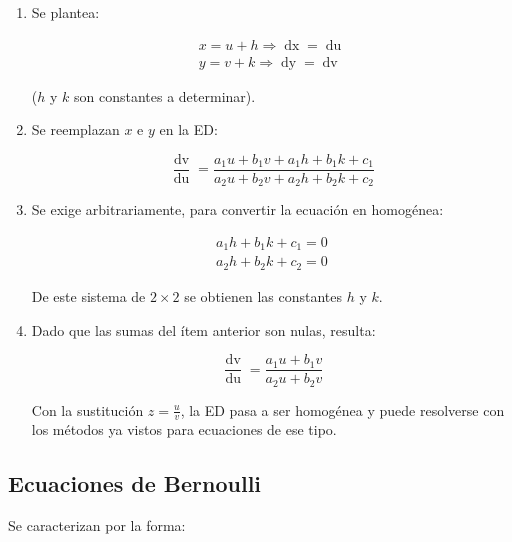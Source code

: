 \documentclass{article}
\begin{document}
\begin{enumerate}
\item Se plantea:

\begin{equation}
\begin{array}{ll}
x = u + h \Rightarrow \mathop{dx} = \mathop{du} \\
y = v + k \Rightarrow \mathop{dy} = \mathop{dv}
\end{array}
\end{equation}

($h$ y $k$ son constantes a determinar).

\item Se reemplazan $x$ e $y$ en la ED:

\begin{equation}
\frac{\mathop{dv}}{\mathop{du}} = \frac{a_1 u + b_1 v + a_1 h + b_1 k + c_1}{a_2 u + b_2 v + a_2 h + b_2 k + c_2}
\end{equation}

\item Se exige arbitrariamente, para convertir la ecuación en homogénea:

\begin{equation}
\begin{array}{ll}
a_1 h + b_1 k + c_1 = 0 \\
a_2 h + b_2 k + c_2 = 0
\end{array}
\end{equation}

De este sistema de $2 \times 2$ se obtienen las constantes $h$ y $k$.

\item Dado que las sumas del ítem anterior son nulas, resulta:

\begin{equation}
\frac{\mathop{dv}}{\mathop{du}} = \frac{a_1 u + b_1 v}{a_2 u + b_2 v}
\end{equation}

Con la sustitución $z = \frac{u}{v}$, la ED pasa a ser homogénea y puede resolverse con los métodos ya vistos para ecuaciones de ese tipo.

\end{enumerate}

\subsection{Ecuaciones de Bernoulli}

Se caracterizan por la forma:
\end{document}
